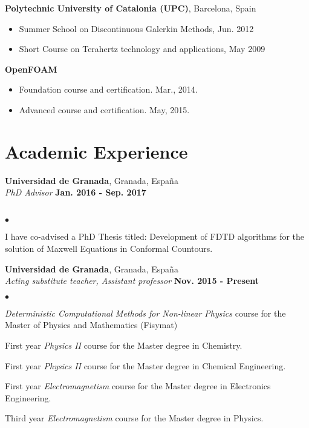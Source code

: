 \documentclass[margin,line]{res}
\newenvironment{list2}{
  \begin{list}{$\bullet$}{%
      \setlength{\itemsep}{0in}
      \setlength{\parsep}{0in} \setlength{\parskip}{0in}
      \setlength{\topsep}{0in} \setlength{\partopsep}{0in} 
      \setlength{\leftmargin}{0.2in}}}{\end{list}}
\begin{document}
\begin{resume}
\begin{minipage}{\textwidth}
{\bf Polytechnic University of Catalonia (UPC)}, Barcelona, Spain\\
\vspace*{-.1in}
\begin{itemize}
\item Summer School on Discontinuous Galerkin Methods,  Jun. 2012
\item Short Course on Terahertz technology and applications, May 2009
\end{itemize}
\end{minipage}

\begin{minipage}{\textwidth}
{\bf OpenFOAM}\\
\vspace*{-.1in}
\begin{itemize}
\item Foundation course and certification. Mar., 2014.
\item Advanced course and certification. May, 2015.
\end{itemize}
\end{minipage}


\section{\sc Academic Experience}
{\bf Universidad de Granada}, Granada, España\\
{\em PhD Advisor} \hfill {\bf Jan. 2016 - Sep. 2017}\\\\
\vspace*{-.25in}  
\begin{list2}
	\item I have co-advised a PhD Thesis titled: Development of FDTD algorithms for the solution of Maxwell Equations in Conformal Countours.
\end{list2}

{\bf Universidad de Granada}, Granada, España\\
{\em Acting substitute teacher, Assistant professor} \hfill {\bf Nov. 2015 - Present}\\
\vspace*{.05in}  
\begin{list2}
 \item \textit{Deterministic Computational Methods for Non-linear Physics} course for the Master of Physics and Mathematics (Fisymat)
 \item First year \textit{Physics II} course for the Master degree in Chemistry.
 \item First year \textit{Physics II} course for the Master degree in Chemical Engineering.
 \item First year \textit{Electromagnetism} course for the Master degree in Electronics Engineering.
 \item Third year \textit{Electromagnetism} course for the Master degree in Physics. 
\end{list2}


\end{resume}
\end{document}
